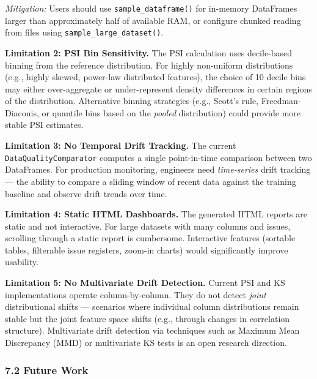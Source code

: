 \documentclass{article}
\begin{document}
\emph{Mitigation:} Users should use \texttt{sample\_dataframe()} for
in-memory DataFrames larger than approximately half of available RAM, or
configure chunked reading from files using
\texttt{sample\_large\_dataset()}.

\textbf{Limitation 2: PSI Bin Sensitivity.} The PSI calculation uses
decile-based binning from the reference distribution. For highly
non-uniform distributions (e.g., highly skewed, power-law distributed
features), the choice of 10 decile bins may either over-aggregate or
under-represent density differences in certain regions of the
distribution. Alternative binning strategies (e.g., Scott's rule,
Freedman-Diaconis, or quantile bins based on the \emph{pooled}
distribution) could provide more stable PSI estimates.

\textbf{Limitation 3: No Temporal Drift Tracking.} The current
\texttt{DataQualityComparator} computes a single point-in-time
comparison between two DataFrames. For production monitoring, engineers
need \emph{time-series} drift tracking --- the ability to compare a
sliding window of recent data against the training baseline and observe
drift trends over time.

\textbf{Limitation 4: Static HTML Dashboards.} The generated HTML
reports are static and not interactive. For large datasets with many
columns and issues, scrolling through a static report is cumbersome.
Interactive features (sortable tables, filterable issue registers,
zoom-in charts) would significantly improve usability.

\textbf{Limitation 5: No Multivariate Drift Detection.} Current PSI and
KS implementations operate column-by-column. They do not detect
\emph{joint} distributional shifts --- scenarios where individual column
distributions remain stable but the joint feature space shifts (e.g.,
through changes in correlation structure). Multivariate drift detection
via techniques such as Maximum Mean Discrepancy (MMD) or multivariate KS
tests is an open research direction.

\subsubsection{7.2 Future Work}\label{future-work}
\end{document}
